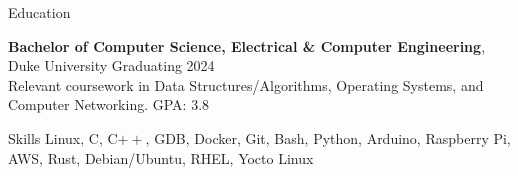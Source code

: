 \documentclass{resume}
\begin{document}






\begin{rSection}{Education}

\textbf{Bachelor of Computer Science, Electrical \& Computer Engineering}, Duke University \hfill {Graduating 2024}\\
Relevant coursework in Data Structures/Algorithms, Operating Systems, and Computer Networking. \hfill {GPA: 3.8}


\end{rSection}

\begin{rSection}{Skills}
    Linux, C, C$++$, GDB, Docker, Git, Bash, Python, Arduino, Raspberry Pi, AWS, Rust, Debian/Ubuntu, RHEL, Yocto Linux
\end{rSection}

\end{document}
